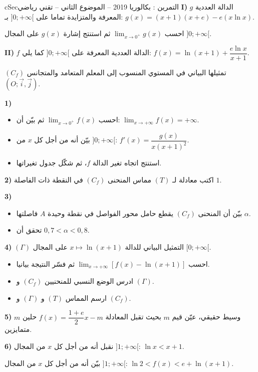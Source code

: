\documentclass[12pt,a4paper]{article}
\newenvironment{BOX}[2]{\begin{otherlanguage}{english}\begin{arbox}{#1}{#2}}{\end{arbox}\end{otherlanguage}}
\newcounter{exo}
\newenvironment{tamrin}[1]{\stepcounter{exo}\begin{BOX}{cSec}{التمرين \theexo: #1}}{\end{BOX}}
\newenvironment{sq}{\begin{itemize}[leftmargin=2.4em,itemsep=3pt]}{\end{itemize}}
\newcommand{\qa}{\item[(أ)]}\newcommand{\qb}{\item[(ب)]}\newcommand{\qc}{\item[(جـ)]}\newcommand{\qd}{\item[(د)]}\newcommand{\qe}{\item[(هـ)]}
\begin{document}
\begin{tamrin}{بكالوريا 2019 -- الموضوع الثاني -- تقني رياضي}
\textbf{I)} $g$ الدالة العددية المعرفة والمتزايدة تماما على $]0;+\infty[$ بـ: $g(x)=(x+1)(x+e)-e(x\ln x)$.

احسب $\displaystyle\lim_{x\to0^+}g(x)$ ثم استنتج إشارة $g(x)$ على المجال $]0;+\infty[$.

\textbf{II)} $f$ الدالة العددية المعرفة على $]0;+\infty[$ كما يلي: $f(x)=\ln(x+1)+\dfrac{e\ln x}{x+1}$.

$(C_f)$ تمثيلها البياني في المستوي المنسوب إلى المعلم المتعامد والمتجانس $(O;\vec i,\vec j)$.

\textbf{1)}
\begin{sq}
\qa احسب $\displaystyle\lim_{x\to0^+}f(x)$ ثم بيّن أن: $\displaystyle\lim_{x\to+\infty}f(x)=+\infty$.
\qb بيّن أنه من أجل كل $x$ من $]0;+\infty[$: $f'(x)=\dfrac{g(x)}{x(x+1)^2}$.
\qc استنتج اتجاه تغير الدالة $f$، ثم شكّل جدول تغيراتها.
\end{sq}
\textbf{2)} اكتب معادلة لـ $(T)$ مماس المنحنى $(C_f)$ في النقطة ذات الفاصلة $1$.

\textbf{3)}
\begin{sq}
\qa بيّن أن المنحنى $(C_f)$ يقطع حامل محور الفواصل في نقطة وحيدة $A$ فاصلتها $\alpha$.
\qb تحقق أن $0{,}7<\alpha<0{,}8$.
\end{sq}
\textbf{4)} $(\Gamma)$ التمثيل البياني للدالة $x\mapsto\ln(x+1)$ على المجال $[0;+\infty[$.
\begin{sq}
\qa احسب $\displaystyle\lim_{x\to+\infty}\left[f(x)-\ln(x+1)\right]$ ثم فسّر النتيجة بيانيا.
\qb ادرس الوضع النسبي للمنحنيين $(C_f)$ و $(\Gamma)$.
\qc ارسم المماس $(T)$ و $(\Gamma)$ و $(C_f)$.
\end{sq}
\textbf{5)} $m$ وسيط حقيقي، عيّن قيم $m$ بحيث تقبل المعادلة $f(x)=\dfrac{1+e}{2}x-m$ حلين متمايزين.

\textbf{6)} نقبل أنه من أجل كل $x$ من المجال $]1;+\infty[$: $\ln x<x+1$.

بيّن أنه من أجل كل $x$ من المجال $]1;+\infty[$: $\ln2<f(x)<e+\ln(x+1)$.
\end{tamrin}
\end{document}
